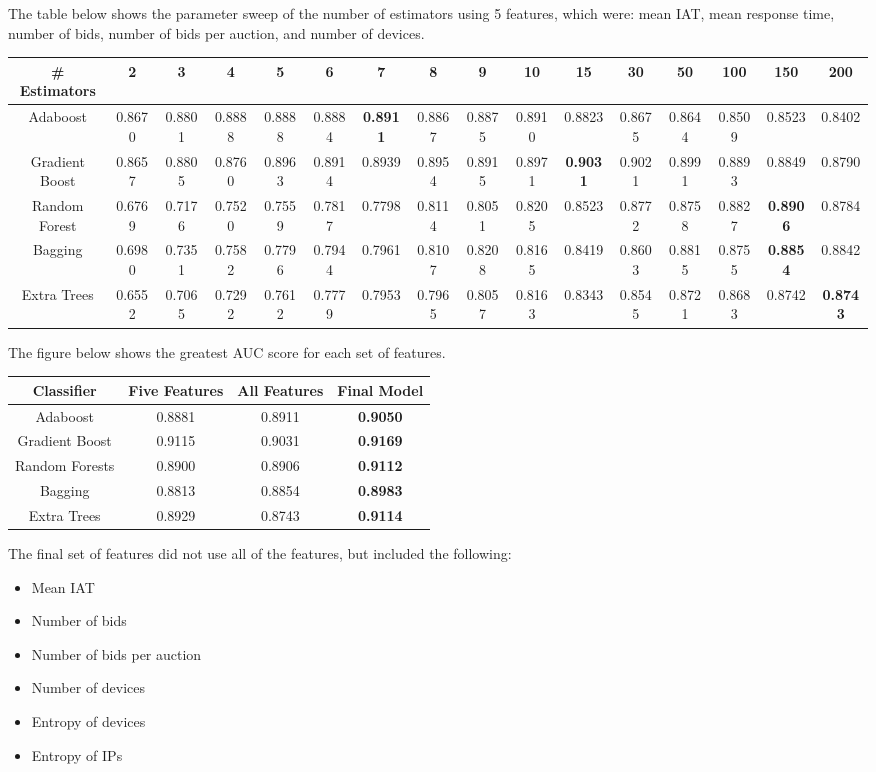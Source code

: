 \documentclass{article} %
\begin{document}
The table below shows the parameter sweep of the number of estimators using 5 features, which were: mean IAT, mean response time, number of bids, number of bids per auction, and number of devices.

\begin{adjustbox}{width=\textwidth,totalheight=\textheight,keepaspectratio}
\begin{tabular}{c | c c c c c c c c c c c c c c c}
\# Estimators & 2 & 3 & 4 & 5 & 6 & 7 & 8 & 9 & 10 & 15 & 30 & 50 & 100 & 150 & 200\\
\hline
Adaboost & 0.8670 & 0.8801 & 0.8888 & 0.8888 & 0.8884 & \textbf{0.8911} & 0.8867 & 0.8875 & 0.8910 & 0.8823 & 0.8675 & 0.8644 & 0.8509 & 0.8523 & 0.8402\\
Gradient Boost & 0.8657 & 0.8805 & 0.8760 & 0.8963 & 0.8914 & 0.8939 & 0.8954 & 0.8915 & 0.8971 & \textbf{0.9031} & 0.9021 & 0.8991 & 0.8893 & 0.8849 & 0.8790\\
Random Forest & 0.6769 & 0.7176 & 0.7520 & 0.7559 & 0.7817 & 0.7798 & 0.8114 & 0.8051 & 0.8205 & 0.8523 & 0.8772 & 0.8758 & 0.8827 & \textbf{0.8906} & 0.8784\\
Bagging & 0.6980 & 0.7351 & 0.7582 & 0.7796 & 0.7944 & 0.7961 & 0.8107 & 0.8208 & 0.8165 & 0.8419 & 0.8603 & 0.8815 & 0.8755 & \textbf{0.8854} & 0.8842\\
Extra Trees & 0.6552 & 0.7065 & 0.7292 & 0.7612 & 0.7779 & 0.7953 & 0.7965 & 0.8057 & 0.8163 & 0.8343 & 0.8545 & 0.8721 & 0.8683 & 0.8742 & \textbf{0.8743}
\end{tabular}
\end{adjustbox}

The figure below shows the greatest AUC score for each set of features.

\begin{tabular}{c|ccc}
Classifier & Five Features & All Features & Final Model\\
\hline
Adaboost & 0.8881 & 0.8911 & \textbf{0.9050}\\
Gradient Boost & 0.9115 & 0.9031 & \textbf{0.9169}\\
Random Forests & 0.8900 & 0.8906 & \textbf{0.9112}\\
Bagging & 0.8813 & 0.8854 & \textbf{0.8983}\\
Extra Trees & 0.8929 & 0.8743 & \textbf{0.9114}
\end{tabular}

The final set of features did not use all of the features, but included the following:

\begin{itemize}
\item Mean IAT
\item Number of bids
\item Number of bids per auction
\item Number of devices
\item Entropy of devices
\item Entropy of IPs
\end{itemize}
\end{document}
